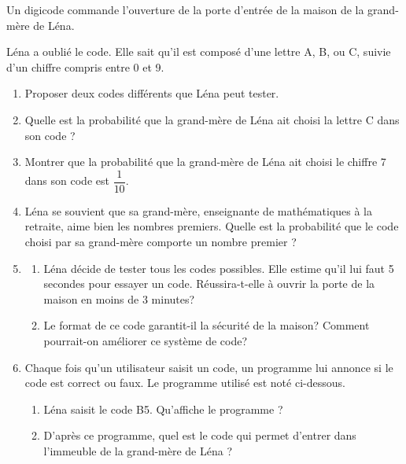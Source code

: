 \documentclass[11pt]{article}
\begin{document}
\medskip

Un digicode commande l'ouverture de la porte d'entrée de la maison de la grand-mère de Léna.

Léna a oublié le code. Elle sait qu'il est composé d'une lettre A, B, ou C, suivie d'un chiffre compris entre 0 et 9.

\medskip

\begin{enumerate}
\item Proposer deux codes différents que Léna peut tester.
\item Quelle est la probabilité que la grand-mère de Léna ait choisi la lettre C dans son code ?
\item Montrer que la probabilité que la grand-mère de Léna ait choisi le chiffre 7 dans son code est $\dfrac{1}{10}$.
\item Léna se souvient que sa grand-mère, enseignante de mathématiques à la retraite, aime bien les nombres premiers. Quelle est la probabilité que le code choisi par sa grand-mère comporte un nombre premier ?
\item 
	\begin{enumerate}
		\item Léna décide de tester tous les codes possibles. Elle estime qu'il lui faut 5 secondes pour essayer un code. Réussira-t-elle à ouvrir la porte de la maison en moins de 3 minutes?
		\item Le format de ce code garantit-il la sécurité de la maison? Comment pourrait-on améliorer ce système de code?
	\end{enumerate}
\item Chaque fois qu'un utilisateur saisit un code, un programme lui annonce si le code est correct ou faux. Le programme utilisé est noté ci-dessous.

\begin{center}
\begin{scratch}
{}
{}
\end{scratch}
\end{center}

	\begin{enumerate}
		\item Léna saisit le code B5. Qu'affiche le programme ?
		\item D'après ce programme, quel est le code qui permet d'entrer dans l'immeuble de la grand-mère
de Léna ?
	\end{enumerate}
\end{enumerate}
\end{document}
